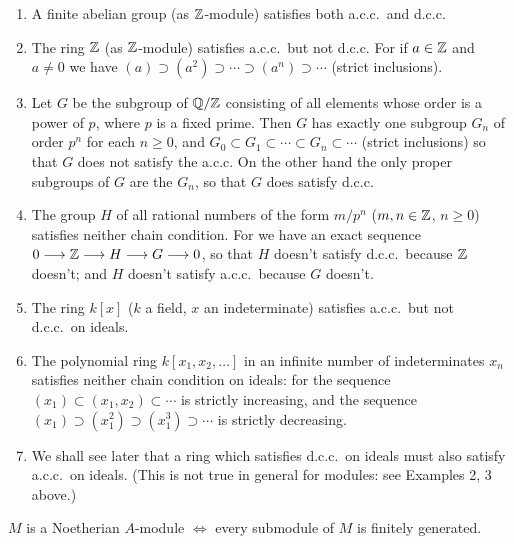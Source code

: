 \begin{examples}
\begin{enumerate}[1)]
    \item A finite abelian group (as $\mathbb{Z}$-module) satisfies both a.c.c.\ and d.c.c.
    
    \item The ring $\mathbb{Z}$ (as $\mathbb{Z}$-module) satisfies a.c.c.\ but not d.c.c. For if $a \in \mathbb{Z}$ and $a \neq 0$ we have $(a) \supset (a^2) \supset \cdots \supset (a^n) \supset \cdots$ (strict inclusions).
    
    \item Let $G$ be the subgroup of $\mathbb{Q}/\mathbb{Z}$ consisting of all elements whose order is a power of $p$, where $p$ is a fixed prime. Then $G$ has exactly one subgroup $G_n$ of order $p^n$ for each $n \geq 0$, and $G_0 \subset G_1 \subset \cdots \subset G_n \subset \cdots$ (strict inclusions) so that $G$ does not satisfy the a.c.c. On the other hand the only proper subgroups of $G$ are the $G_n$, so that $G$ does satisfy d.c.c.
    
    \item The group $H$ of all rational numbers of the form $m/p^n$ ($m, n \in \mathbb{Z}$, $n \geq 0$) satisfies neither chain condition. For we have an exact sequence $0 \longrightarrow \mathbb{Z} \longrightarrow H \longrightarrow G \longrightarrow 0$, so that $H$ doesn't satisfy d.c.c.\ because $\mathbb{Z}$ doesn't; and $H$ doesn't satisfy a.c.c.\ because $G$ doesn't.
    
    \item The ring $k[x]$ ($k$ a field, $x$ an indeterminate) satisfies a.c.c.\ but not d.c.c.\ on ideals.
    
    \item The polynomial ring $k[x_1, x_2, \ldots]$ in an infinite number of indeterminates $x_n$ satisfies neither chain condition on ideals: for the sequence $(x_1) \subset (x_1, x_2) \subset \cdots$ is strictly increasing, and the sequence $(x_1) \supset (x_1^2) \supset (x_1^3) \supset \cdots$ is strictly decreasing.
    
    \item We shall see later that a ring which satisfies d.c.c.\ on ideals must also satisfy a.c.c.\ on ideals. (This is not true in general for modules: see Examples 2, 3 above.)
\end{enumerate}
\end{examples}

\begin{proposition}\label{prop:noetherian-fg}
$M$ is a Noetherian $A$-module $\iff$ every submodule of $M$ is finitely generated.
\end{proposition}

